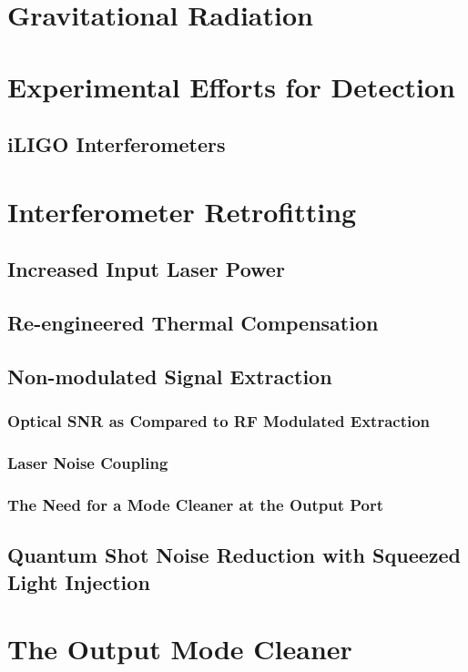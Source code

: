 \documentclass[12pt,vi,twoside]{mitthesis}
\begin{document}

\pagestyle{plain}

%


\chapter{Gravitational Radiation}

\chapter{Experimental Efforts for Detection}
\section{iLIGO Interferometers}

\chapter{Interferometer Retrofitting}
\label{ch:retro}
\section{Increased Input Laser Power}
\section{Re-engineered Thermal Compensation}
\section{Non-modulated Signal Extraction}
\subsection{Optical SNR as Compared to RF Modulated Extraction}
\subsection{Laser Noise Coupling}
\subsection{The Need for a Mode Cleaner at the Output Port}
\section{Quantum Shot Noise Reduction with Squeezed Light Injection}

\chapter{The Output Mode Cleaner}
\end{document}
